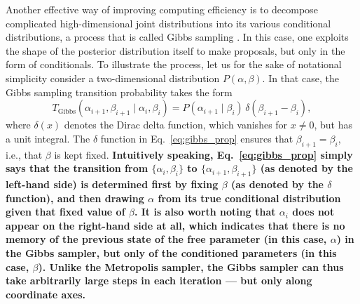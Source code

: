 \documentclass[twocolumn]{aa}
\begin{document}
Another effective way of improving computing efficiency is to decompose
complicated high-dimensional joint distributions into its various
conditional distributions, a process that is called Gibbs sampling
\citep{geman:1984}. In this case, one exploits the shape of the
posterior distribution itself to make proposals, but only in the form
of conditionals. To illustrate the process, let us for the sake of
notational simplicity consider a two-dimensional distribution
$P(\alpha, \beta)$. In that case, the Gibbs sampling transition
probability takes the form
\begin{equation}
  T_{\mathrm{Gibbs}}(\alpha_{i+1}, \beta_{i+1}\mid \alpha_i, \beta_i) =
  P(\alpha_{i+1}\mid \beta_{i})\,\delta(\beta_{i+1}-\beta_i),
  \label{eq:gibbs_prop}
\end{equation}
where $\delta(x)$ denotes the Dirac delta function, which vanishes for
$x\ne 0$, but has a unit integral. The $\delta$ function in
Eq.~\eqref{eq:gibbs_prop} ensures that $\beta_{i+1}=\beta_i$, i.e., that
$\beta$ is kept fixed. {\bf Intuitively speaking, Eq.~\eqref{eq:gibbs_prop} simply says that the transition from $\{\alpha_i,\beta_i\}$ to $\{\alpha_{i+1},\beta_{i+1}\}$ (as denoted by the left-hand side) is determined first by fixing $\beta$ (as denoted by the $\delta$ function), and then drawing $\alpha$ from its true conditional distribution given that fixed value of $\beta$. It is also worth noting that $\alpha_i$ does not appear on the right-hand side at all, which indicates that there is no memory of the previous state of the free parameter (in this case, $\alpha$) in the Gibbs sampler, but only of the conditioned parameters (in this case, $\beta$). Unlike the Metropolis sampler, the Gibbs sampler can thus take arbitrarily large steps in each iteration --- but only along coordinate axes. }

\end{document}
